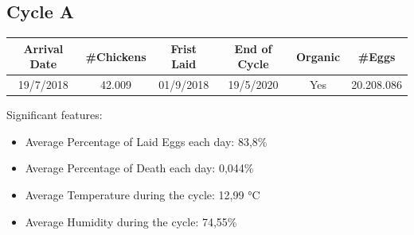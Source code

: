 \documentclass[11pt]{article}
\begin{document}
\subsection{Cycle A}
\begin{center}
    \begin{tabular}{|c | c | c | c | c | c|}
        \hline
        \textbf{Arrival Date} & \textbf{\#Chickens} & \textbf{Frist Laid} & \textbf{End of Cycle} & \textbf{Organic} & \textbf{\#Eggs} \\ [0.5ex]
        \hline
        19/7/2018             & 42.009              & 01/9/2018            & 19/5/2020             & Yes              & 20.208.086      \\
        \hline
    \end{tabular}
\end{center}
Significant features:
\begin{itemize}
    \item Average Percentage of Laid Eggs each day: 83,8\%
    \item Average Percentage of Death each day: 0,044\%
    \item Average Temperature during the cycle: 12,99 °C
    \item Average Humidity during the cycle: 74,55\%
\end{itemize}
\end{document}
